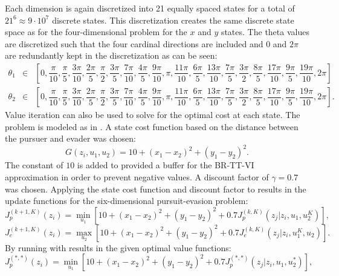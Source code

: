 Each dimension is again discretized into 21 equally spaced states for a total of $21^6 \approx 9\cdot10^7$ discrete states. This discretization creates the same discrete state space as for the four-dimensional problem for the $x$ and $y$ states. The theta values are discretized such that the four cardinal directions are included and $0$ and $2\pi$ are redundantly kept in the discretization as can be seen:
\begin{eqnarray*}
\theta_1 & \in & [0,\dfrac{\pi}{10},\dfrac{\pi}{5},\dfrac{3\pi}{10},\dfrac{2\pi}{5},\dfrac{\pi}{2},\dfrac{3\pi}{5},\dfrac{7\pi}{10},\dfrac{4\pi}{5},\dfrac{9\pi}{10},\pi,\dfrac{11\pi}{10},\dfrac{6\pi}{5},\dfrac{13\pi}{10},\dfrac{7\pi}{5},\dfrac{3\pi}{2},\dfrac{8\pi}{5},\dfrac{17\pi}{10},\dfrac{9\pi}{5},\dfrac{19\pi}{10},2\pi]\\
\theta_2 & \in & [0,\dfrac{\pi}{10},\dfrac{\pi}{5},\dfrac{3\pi}{10},\dfrac{2\pi}{5},\dfrac{\pi}{2},\dfrac{3\pi}{5},\dfrac{7\pi}{10},\dfrac{4\pi}{5},\dfrac{9\pi}{10},\pi,\dfrac{11\pi}{10},\dfrac{6\pi}{5},\dfrac{13\pi}{10},\dfrac{7\pi}{5},\dfrac{3\pi}{2},\dfrac{8\pi}{5},\dfrac{17\pi}{10},\dfrac{9\pi}{5},\dfrac{19\pi}{10},2\pi].
\end{eqnarray*} 
Value iteration can also be used to solve for the optimal cost at each state. The problem is modeled as in . A state cost function based on the distance between the pursuer and evader was chosen: 
\begin{equation}\label{6cost}
G(z_i,u_1,u_2)= 10+(x_1-x_2)^2+(y_1-y_2)^2.
\end{equation}
The constant of $10$ is added to provided a buffer for the BR-TT-VI approximation in order to prevent negative values. A discount factor of $\gamma = 0.7$ was chosen. Applying the state cost function and discount factor to  results in the update functions for the six-dimensional pursuit-evasion problem:
\begin{equation}\label{6pbell}
J_p^{(k+1,K)}(z_i)= \underset{u_1 }{\operatorname{min }}[10+(x_1-x_2)^2+(y_1-y_2)^2+0.7 J_p^{(k,K)}(z_j|z_i,u_1,u_2^K)],
\end{equation}
\begin{equation}\label{6ebell}
J_e^{(k+1,K)}(z_i)= \underset{u_2 }{\operatorname{max }}[10+(x_1-x_2)^2+(y_1-y_2)^2+0.7 J_e^{(k,K)}(z_j|z_i,u_1^K,u_2)].
\end{equation} 
By running  with  results in the given optimal value functions:
\begin{equation}\label{6pbropt}
J_p^{(*,*)}(z_i)= \underset{u_1 }{\operatorname{min }}[10+(x_1-x_2)^2+(y_1-y_2)^2+0.7 J_p^{(*,*)}(z_j|z_i,u_1,u_2^*)],
\end{equation}
